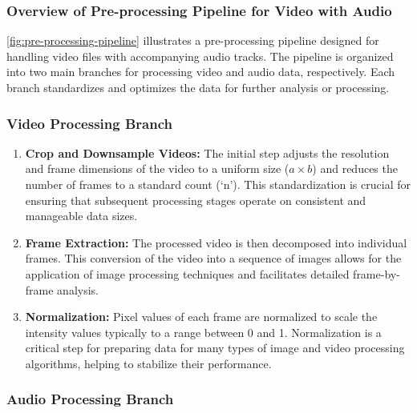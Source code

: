 \documentclass{ioereport}
\begin{document}
    \subsubsection{Overview of Pre-processing Pipeline for Video with Audio}
    \autoref{fig:pre-processing-pipeline} illustrates a pre-processing pipeline designed for handling video files with accompanying audio tracks. The pipeline is organized into two main branches for processing video and audio data, respectively. Each branch standardizes and optimizes the data for further analysis or processing.
    
    \subsubsection{Video Processing Branch}
    \begin{enumerate}[label=\textbf{\roman*.}]
        \item \textbf{Crop and Downsample Videos:}
        The initial step adjusts the resolution and frame dimensions of the video to a uniform size (\(a \times b\)) and reduces the number of frames to a standard count (`n'). This standardization is crucial for ensuring that subsequent processing stages operate on consistent and manageable data sizes.
        
        \item \textbf{Frame Extraction:}
        The processed video is then decomposed into individual frames. This conversion of the video into a sequence of images allows for the application of image processing techniques and facilitates detailed frame-by-frame analysis.
        
        \item \textbf{Normalization:}
        Pixel values of each frame are normalized to scale the intensity values typically to a range between 0 and 1. Normalization is a critical step for preparing data for many types of image and video processing algorithms, helping to stabilize their performance.
    \end{enumerate}
    
    \subsubsection{Audio Processing Branch}
    
\end{document}
